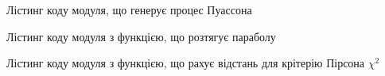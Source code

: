 \append{}
Лістинг коду модуля, що генерує процес Пуассона
\lstset{inputencoding=utf8, extendedchars=\true}

Лістинг коду модуля з функцією, що розтягує параболу
\lstset{inputencoding=utf8, extendedchars=\true}

Лістинг коду модуля з функцією, що рахує відстань для крітерію Пірсона $\chi^2$
\lstset{inputencoding=utf8, extendedchars=\true}

